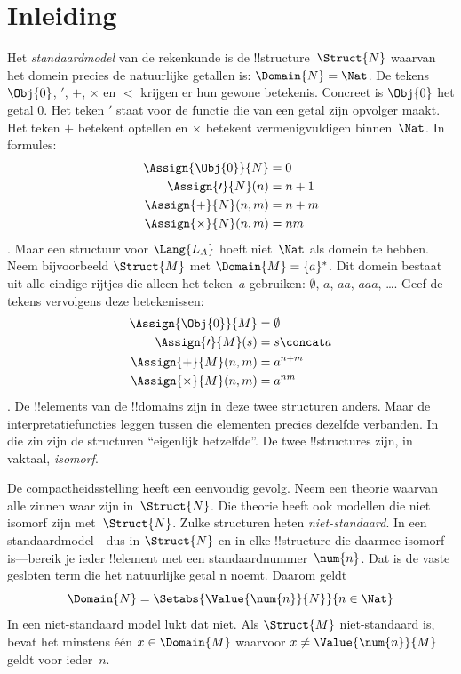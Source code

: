 \documentclass[openany]{memoir}
\begin{document}
\section{Inleiding}

Het \emph{standaardmodel} van de rekenkunde is de
!!{structure}~$\Struct{N}$ waarvan het domein precies de natuurlijke
getallen is: $\Domain{N} = \Nat$. De tekens $\Obj{0}$, $\prime$, $+$,
$\times$ en $<$ krijgen er hun gewone betekenis. Concreet is $\Obj{0}$ het
getal $0$. Het teken $\prime$ staat voor de functie die van een getal zijn
opvolger maakt. Het teken $+$ betekent optellen en $\times$ betekent
vermenigvuldigen binnen~$\Nat$. In formules:
\begin{align*}
  \Assign{\Obj{0}}{N} & = 0\\
  \Assign{\prime}{N}(n) & = n + 1\\
  \Assign{+}{N}(n, m) & = n + m\\
  \Assign{\times}{N}(n, m) & = nm
\end{align*}.
Maar een structuur voor $\Lang{L_A}$ hoeft niet~$\Nat$ als domein te hebben.
Neem bijvoorbeeld $\Struct{M}$ met
$\Domain{M} = \{a\}^*$. Dit domein bestaat uit alle eindige rijtjes die
alleen het teken~$a$ gebruiken: $\emptyset$, $a$, $aa$, $aaa$, \dots. Geef
de tekens vervolgens deze betekenissen:
\begin{align*}
  \Assign{\Obj{0}}{M} & = \emptyset\\
  \Assign{\prime}{M}(s) & = s \concat a\\
  \Assign{+}{M}(n, m) & = a^{n + m}\\
  \Assign{\times}{M}(n, m) & = a^{nm}
\end{align*}.
De !!{element}s van de !!{domain}s zijn in deze twee structuren anders.
Maar de interpretatiefuncties leggen tussen die elementen precies dezelfde
verbanden. In die zin zijn de structuren ``eigenlijk hetzelfde''. De twee
!!{structure}s zijn, in vaktaal, \emph{isomorf}.

De compactheidsstelling heeft een eenvoudig gevolg. Neem een theorie waarvan
alle zinnen waar zijn in~$\Struct{N}$. Die theorie heeft ook modellen die
niet isomorf zijn met~$\Struct{N}$. Zulke structuren heten
\emph{niet-standaard}. In een standaardmodel---dus in $\Struct{N}$ en in
elke !!{structure} die daarmee isomorf is---bereik je ieder !!{element} met
een standaardnummer~$\num{n}$. Dat is de vaste gesloten term die het
natuurlijke getal n noemt. Daarom geldt
\[
\Domain{N} = \Setabs{\Value{\num{n}}{N}}{n \in \Nat}
\]
In een niet-standaard model lukt dat niet. Als $\Struct{M}$ niet-standaard
is, bevat het minstens één $x \in \Domain{M}$ waarvoor
$x \neq \Value{\num{n}}{M}$ geldt voor ieder~$n$.
\end{document}
